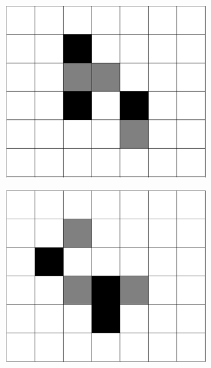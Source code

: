\documentclass[12pt]{article}
\numberwithin{figure}{section} %
\begin{document}
\begin{figure}[H]
\begin{subfigure}{0.18\textwidth}
     	\subcaption{}
   	\end{subfigure}
     	\begin{subfigure}{0.18\textwidth}
     	\centering
     	\includegraphics[width=\linewidth]{Section4/30.2}
     	\subcaption{}
   	\end{subfigure}
        	\begin{subfigure}{0.18\textwidth}
     	\centering
     	\includegraphics[width=\linewidth]{Section4/30.3}
     	\subcaption{}

\end{subfigure}
\end{figure}
\end{document}

